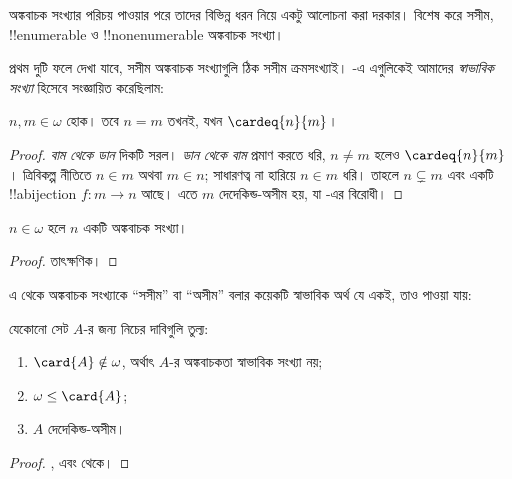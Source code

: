 \documentclass[../../../include/open-logic-section]{subfiles}
\begin{document}

অঙ্কবাচক সংখ্যার পরিচয় পাওয়ার পরে তাদের বিভিন্ন ধরন
নিয়ে একটু আলোচনা করা দরকার। বিশেষ করে সসীম,
!!{enumerable} ও !!{nonenumerable} অঙ্কবাচক সংখ্যা।

প্রথম দুটি ফলে দেখা যাবে, সসীম অঙ্কবাচক সংখ্যাগুলি
ঠিক সসীম ক্রমসংখ্যাই। -এ
এগুলিকেই আমাদের \emph{স্বাভাবিক সংখ্যা} হিসেবে সংজ্ঞায়িত করেছিলাম:

\begin{prop}
$n,m\in\omega$ হোক। তবে $n=m$ তখনই, যখন $\cardeq{n}{m}$।
\end{prop}

\begin{proof}
\emph{বাম থেকে ডান} দিকটি সরল। \emph{ডান থেকে বাম}
প্রমাণ করতে ধরি, $n\neq m$ হলেও $\cardeq{n}{m}$।
ত্রিবিকল্প নীতিতে $n\in m$ অথবা $m\in n$; সাধারণত্ব না হারিয়ে
$n\in m$ ধরি। তাহলে $n\subsetneq m$ এবং
একটি !!a{bijection} $f\colon m\to n$ আছে। এতে $m$
দেদেকিন্ড-অসীম হয়, যা
-এর
বিরোধী।
\end{proof}

\begin{cor}
$n\in\omega$ হলে $n$ একটি অঙ্কবাচক সংখ্যা।
\end{cor}

\begin{proof}
তাৎক্ষণিক।
\end{proof}
\noindent
এ থেকে অঙ্কবাচক সংখ্যাকে ``সসীম'' বা ``অসীম''
বলার কয়েকটি স্বাভাবিক অর্থ যে একই, তাও পাওয়া যায়:
\begin{thm}যেকোনো সেট $A$-র জন্য নিচের দাবিগুলি তুল্য:
\begin{enumerate}
	\item{} $\card{A}\notin\omega$,
	অর্থাৎ $A$-র অঙ্কবাচকতা স্বাভাবিক সংখ্যা নয়;
	\item{} $\omega\leq\card{A}$;
	\item{} $A$ দেদেকিন্ড-অসীম।
\end{enumerate}
\end{thm}

\begin{proof}
,
এবং  থেকে।
\end{proof}
\end{document}
